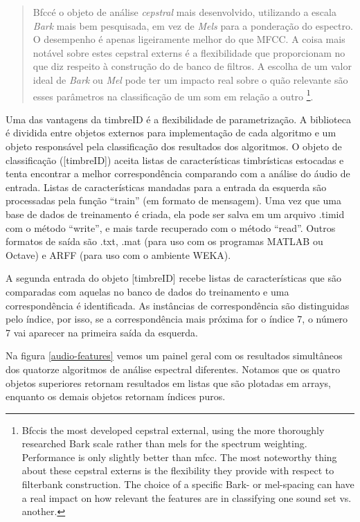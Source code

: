 \documentclass{ppgmus}
\begin{document}
\begin{quote}
Bfcc\texttildelow é o objeto de análise \textit{cepstral} mais desenvolvido, utilizando a escala \textit{Bark} 
mais bem pesquisada, em vez de \textit{Mels} para a ponderação do espectro. O desempenho é apenas ligeiramente melhor do 
que MFCC\texttildelow. A coisa mais notável sobre estes cepstral externs é a flexibilidade que proporcionam no 
que diz respeito à construção do de banco de filtros. A escolha de um valor ideal de \textit{Bark} ou \textit{Mel} 
 pode ter um impacto real sobre o quão relevante são esses parâmetros na classificação de um som em relação a outro
\footnote{Bfcc\texttildelow is the most developed cepstral external, using the more thoroughly researched Bark scale rather than mels for 
the spectrum weighting. Performance is only slightly better than mfcc\texttildelow. The most noteworthy thing about these cepstral 
externs is the flexibility they provide with respect to filterbank construction. The choice of a specific Bark- or 
mel-spacing can have a real impact on how relevant the features are in classifying one sound set vs. another.}. 
\cite{brentcepstral}
 
\end{quote}


Uma das vantagens da timbreID é a flexibilidade de parametrização. A biblioteca é dividida
entre objetos externos para implementação de cada algoritmo e um objeto responsável pela
classificação dos resultados dos algoritmos. O objeto de classificação ([timbreID]) aceita
listas de características timbrísticas estocadas e tenta encontrar a melhor correspondência comparando
com a análise do áudio de entrada.
Listas de características mandadas para a entrada da esquerda são processadas pela função
``train'' (em formato de mensagem). Uma vez que uma base de dados de treinamento é criada, ela
pode ser salva em um arquivo .timid com o método ``write'', e mais tarde recuperado com o método
``read''. Outros formatos de saída são .txt, .mat (para uso com os programas MATLAB ou Octave)
e ARFF (para uso com o ambiente WEKA).

A segunda entrada do objeto [timbreID] recebe listas de características que são comparadas com
aquelas no banco de dados do treinamento e uma correspondência é identificada. As instâncias de 
correspondência são distinguidas pelo índice, por isso, se a correspondência mais próxima for o 
índice 7, o número 7 vai aparecer na primeira saída da esquerda.

Na figura \ref{audio-features} vemos um painel geral com os resultados simultâneos dos quatorze
algoritmos de análise espectral diferentes. Notamos que os quatro objetos superiores retornam resultados em 
listas que são plotadas em arrays, enquanto os demais objetos retornam índices puros.
\end{document}
